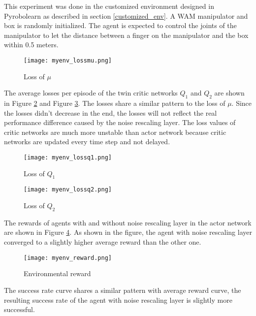 \documentclass[a4paper, 12pt]{report}
\begin{document}
    This experiment was done in the customized environment designed in Pyrobolearn as described in section \ref{customized_env}. A WAM manipulator and box is randomly initialized. The agent is expected to control the joints of the manipulator to let the distance between a finger on the manipulator and the box within 0.5 meters.

        \begin{figure}[H]
        \centering
        \texttt{[image: myenv\_lossmu.png]}
        \caption{Loss of $\mu$}
            \label{fcn_lossmu}
        \end{figure}

    The average losses per episode of the twin critic networks $Q_1$ and $Q_2$ are shown in Figure \ref{fcn_lossq1} and Figure \ref{fcn_lossq2}. The losses share a similar pattern to the loss of $\mu$. Since the losses didn't decrease in the end, the losses will not reflect the real performance difference caused by the noise rescaling layer. The loss values of critic networks are much more unstable than actor network because critic networks are updated every time step and not delayed.

        \begin{figure}[H]
        \centering
        \texttt{[image: myenv\_lossq1.png]}
        \caption{Loss of $Q_1$}
            \label{fcn_lossq1}
        \end{figure}

        \begin{figure}[H]
        \centering
        \texttt{[image: myenv\_lossq2.png]}
        \caption{Loss of $Q_2$}
            \label{fcn_lossq2}
        \end{figure}

    The rewards of agents with and without noise rescaling layer in the actor network are shown in Figure \ref{fcn_reward}. As shown in the figure, the agent with noise rescaling layer converged to a slightly higher average reward than the other one.

        \begin{figure}[H]
        \centering
        \texttt{[image: myenv\_reward.png]}
        \caption{Environmental reward}
            \label{fcn_reward}
        \end{figure}

    The success rate curve shares a similar pattern with average reward curve, the resulting success rate of the agent with noise rescaling layer is slightly more successful.
\end{document}

